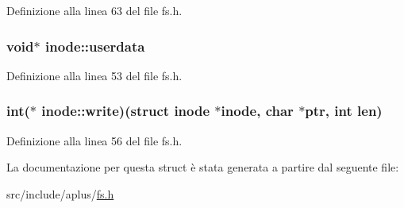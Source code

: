 Definizione alla linea 63 del file fs.\+h.

\hypertarget{structinode_a8ba627a7ebbacc723e8452fbf8dd3670}{
\subsubsection[{userdata}]{\setlength{\rightskip}{0pt plus 5cm}void$\ast$ inode\+::userdata}}\label{structinode_a8ba627a7ebbacc723e8452fbf8dd3670}


Definizione alla linea 53 del file fs.\+h.

\hypertarget{structinode_a53a123d38834fa17e7ef5c1e5f47bba2}{
\subsubsection[{write}]{\setlength{\rightskip}{0pt plus 5cm}int($\ast$ inode\+::write)(struct {\bf inode} $\ast${\bf inode}, char $\ast$ptr, int len)}}\label{structinode_a53a123d38834fa17e7ef5c1e5f47bba2}


Definizione alla linea 56 del file fs.\+h.



La documentazione per questa struct è stata generata a partire dal seguente file\+:\begin{DoxyCompactItemize}
\item 
src/include/aplus/\hyperlink{fs_8h}{fs.\+h}\end{DoxyCompactItemize}
